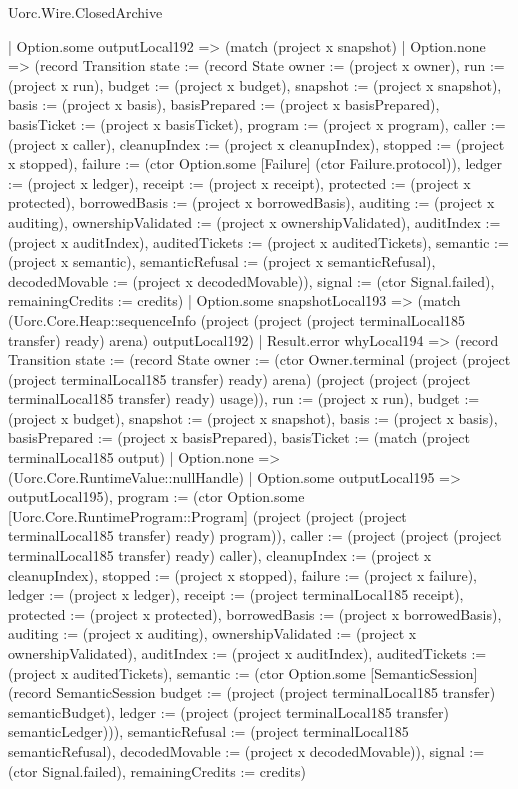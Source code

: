 \begin{lexlean}{Uorc.Wire.ClosedArchive}
\begin{semanticmodule}
{            | Option.some outputLocal192 => (match (project x snapshot)
              | Option.none => (record Transition {state := (record State {owner := (project x owner), run := (project x run), budget := (project x budget), snapshot := (project x snapshot), basis := (project x basis), basisPrepared := (project x basisPrepared), basisTicket := (project x basisTicket), program := (project x program), caller := (project x caller), cleanupIndex := (project x cleanupIndex), stopped := (project x stopped), failure := (ctor Option.some [Failure] (ctor Failure.protocol)), ledger := (project x ledger), receipt := (project x receipt), protected := (project x protected), borrowedBasis := (project x borrowedBasis), auditing := (project x auditing), ownershipValidated := (project x ownershipValidated), auditIndex := (project x auditIndex), auditedTickets := (project x auditedTickets), semantic := (project x semantic), semanticRefusal := (project x semanticRefusal), decodedMovable := (project x decodedMovable)}), signal := (ctor Signal.failed), remainingCredits := credits})
              | Option.some snapshotLocal193 => (match (Uorc.Core.Heap::sequenceInfo (project (project (project terminalLocal185 transfer) ready) arena) outputLocal192)
                | Result.error whyLocal194 => (record Transition {state := (record State {owner := (ctor Owner.terminal (project (project (project terminalLocal185 transfer) ready) arena) (project (project (project terminalLocal185 transfer) ready) usage)), run := (project x run), budget := (project x budget), snapshot := (project x snapshot), basis := (project x basis), basisPrepared := (project x basisPrepared), basisTicket := (match (project terminalLocal185 output)
                  | Option.none => (Uorc.Core.RuntimeValue::nullHandle)
                  | Option.some outputLocal195 => outputLocal195), program := (ctor Option.some [Uorc.Core.RuntimeProgram::Program] (project (project (project terminalLocal185 transfer) ready) program)), caller := (project (project (project terminalLocal185 transfer) ready) caller), cleanupIndex := (project x cleanupIndex), stopped := (project x stopped), failure := (project x failure), ledger := (project x ledger), receipt := (project terminalLocal185 receipt), protected := (project x protected), borrowedBasis := (project x borrowedBasis), auditing := (project x auditing), ownershipValidated := (project x ownershipValidated), auditIndex := (project x auditIndex), auditedTickets := (project x auditedTickets), semantic := (ctor Option.some [SemanticSession] (record SemanticSession {budget := (project (project terminalLocal185 transfer) semanticBudget), ledger := (project (project terminalLocal185 transfer) semanticLedger)})), semanticRefusal := (project terminalLocal185 semanticRefusal), decodedMovable := (project x decodedMovable)}), signal := (ctor Signal.failed), remainingCredits := credits})
}
\end{semanticmodule}
\end{lexlean}
